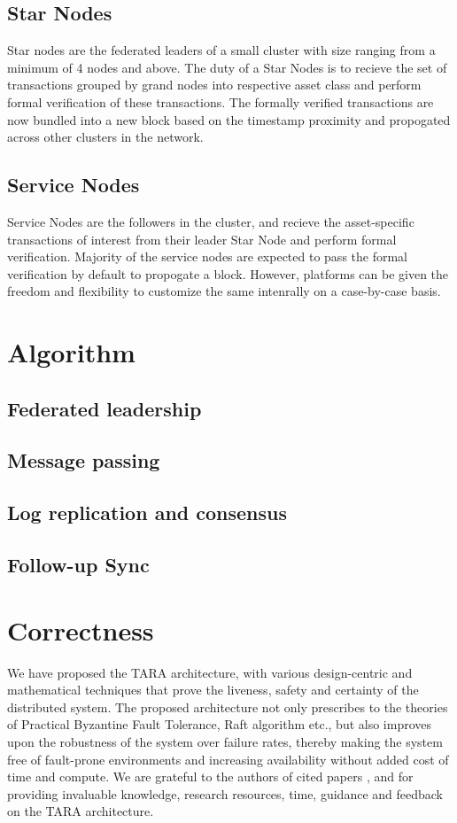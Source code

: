 \documentclass[]{article}
\begin{document}
\subsection{Star Nodes}
Star nodes are the federated leaders of a small cluster with size ranging from a minimum of 4 nodes and above.
The duty of a Star Nodes is to recieve the set of transactions grouped by grand nodes into respective asset class and perform formal verification of these transactions.
The formally verified transactions are now bundled into a new block based on the timestamp proximity and propogated across other clusters in the network. 
\subsection{Service Nodes}
Service Nodes are the followers in the cluster, and recieve the asset-specific transactions of interest from their leader Star Node and perform formal verification. Majority of the service nodes are expected to pass the formal verification by default to propogate a block. However, platforms can be given the freedom and flexibility to customize the same intenrally on a case-by-case basis.

\section{Algorithm}
\subsection{Federated leadership}
\subsection{Message passing}
\subsection{Log replication and consensus}
\subsection{Follow-up Sync}

\section{Correctness}
We have proposed the TARA architecture, with various design-centric and mathematical techniques that prove the liveness, safety and certainty of the distributed system. The proposed architecture not only prescribes to the theories of Practical Byzantine Fault Tolerance, Raft algorithm etc., but also improves upon the robustness of the system over failure rates, thereby making the system free of fault-prone environments and increasing availability without added cost of time and compute.
We are grateful to the authors of cited papers \cite{ARTICLE:1}, \cite{ARTICLE:2} and \cite{ARTICLE:3} for providing invaluable knowledge, research resources, time, guidance and feedback on the TARA architecture.
\end{document}
